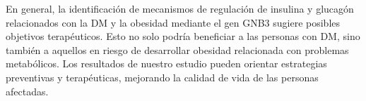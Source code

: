 En general, la identificación de mecanismos de regulación de insulina y glucagón relacionados con la DM y la obesidad  \cite{Shah2011} mediante el gen GNB3 sugiere posibles objetivos terapéuticos. Esto no solo podría beneficiar a las personas con DM, sino también a aquellos en riesgo de desarrollar obesidad relacionada con problemas metabólicos. Los resultados de nuestro estudio pueden orientar estrategias preventivas y terapéuticas, mejorando la calidad de vida de las personas afectadas.

